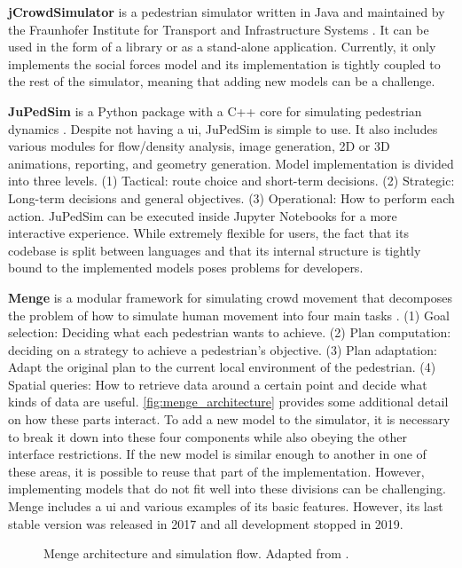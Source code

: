 \documentclass[twoside, 11pt]{article}
\begin{document}
\textbf{jCrowdSimulator} is a pedestrian simulator written in Java and maintained by the Fraunhofer Institute for Transport and Infrastructure Systems \cite{meinert2019simulation}. It can be used in the form of a library or as a stand-alone application. Currently, it only implements the social forces model and its implementation is tightly coupled to the rest of the simulator, meaning that adding new models can be a challenge.

\textbf{JuPedSim} is a Python package with a C++ core for simulating pedestrian dynamics \cite{kemlohwagoumJuPedSimOpenFramework2015}. Despite not having a \gls{ui}, JuPedSim is simple to use. It also includes various modules for flow/density analysis, image generation, 2D or 3D animations, reporting, and geometry generation. Model implementation is divided into three levels. (1) Tactical: route choice and short-term decisions. (2) Strategic: Long-term decisions and general objectives. (3) Operational: How to perform each action. JuPedSim can be executed inside Jupyter Notebooks for a more interactive experience. While extremely flexible for users, the fact that its codebase is split between languages and that its internal structure is tightly bound to the implemented models poses problems for developers.

\textbf{Menge} is a modular framework for simulating crowd movement that decomposes the problem of how to simulate human movement into four main tasks \cite{curtisMengeModularFramework2016}. (1) Goal selection: Deciding what each pedestrian wants to achieve. (2) Plan computation: deciding on a strategy to achieve a pedestrian's objective. (3) Plan adaptation: Adapt the original plan to the current local environment of the pedestrian. (4) Spatial queries: How to retrieve data around a certain point and decide what kinds of data are useful. \autoref{fig:menge_architecture} provides some additional detail on how these parts interact. To add a new model to the simulator, it is necessary to break it down into these four components while also obeying the other interface restrictions. If the new model is similar enough to another in one of these areas, it is possible to reuse that part of the implementation. However, implementing models that do not fit well into these divisions can be challenging. Menge includes a \gls{ui} and various examples of its basic features. However, its last stable version was released in 2017 and all development stopped in 2019.

\begin{figure}[h]
  \centering
  
  \caption[Menge architecture and simulation flow]{Menge architecture and simulation flow. Adapted from \cite{curtisMengeModularFramework2016}.}
  \label{fig:menge_architecture}
\end{figure}
\end{document}
